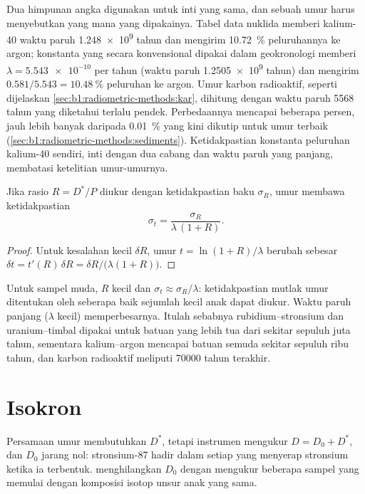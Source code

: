 Dua himpunan angka digunakan untuk inti yang sama, dan sebuah umur harus menyebutkan yang mana yang dipakainya. Tabel data nuklida memberi kalium-40 waktu paruh \num{1.248e9} tahun dan mengirim \qty{10.72}{\percent} peluruhannya ke argon; konstanta yang secara konvensional dipakai dalam geokronologi memberi $\lambda = \num{5.543e-10}$ per tahun (waktu paruh \num{1.2505e9} tahun) dan mengirim $0.581/5.543 = \qty{10.48}{\percent}$ peluruhan ke argon. Umur karbon radioaktif, seperti dijelaskan \cref{sec:b1:radiometric-methods:kar}, dihitung dengan waktu paruh \num{5568} tahun yang diketahui terlalu pendek. Perbedaannya mencapai beberapa persen, jauh lebih banyak daripada \qty{0.01}{\percent} yang kini dikutip untuk umur terbaik (\cref{sec:b1:radiometric-methods:sediments}). Ketidakpastian konstanta peluruhan kalium-40 sendiri, inti dengan dua cabang dan waktu paruh yang panjang, membatasi ketelitian umur-umurnya.

\begin{proposition}\label{prop:b1:radiometric-methods:precision}
Jika rasio $R = D^*/P$ diukur dengan ketidakpastian baku $\sigma_R$, umur membawa ketidakpastian
\[
  \sigma_t = \frac{\sigma_R}{\lambda\,(1 + R)}.
\]
\end{proposition}

\begin{proof}
Untuk kesalahan kecil $\delta R$, umur $t = \ln(1+R)/\lambda$ berubah sebesar $\delta t = t'(R)\,\delta R = \delta R/\bigl(\lambda(1 + R)\bigr)$.
\end{proof}

Untuk sampel muda, $R$ kecil dan $\sigma_t \approx \sigma_R/\lambda$: ketidakpastian mutlak umur ditentukan oleh seberapa baik sejumlah kecil anak dapat diukur. Waktu paruh panjang ($\lambda$ kecil) memperbesarnya. Itulah sebabnya rubidium--stronsium dan uranium--timbal dipakai untuk batuan yang lebih tua dari sekitar sepuluh juta tahun, sementara kalium--argon mencapai batuan semuda sekitar sepuluh ribu tahun, dan karbon radioaktif meliputi \num{70000} tahun terakhir.

\section{Isokron}\label{sec:b1:radiometric-methods:isochrons}

Persamaan umur membutuhkan $D^*$, tetapi instrumen mengukur $D = D_0 + D^*$, dan $D_0$ jarang nol: stronsium-87 hadir dalam setiap  yang menyerap stronsium ketika ia terbentuk.  menghilangkan $D_0$ dengan mengukur beberapa sampel yang memulai dengan komposisi isotop unsur anak yang sama.

